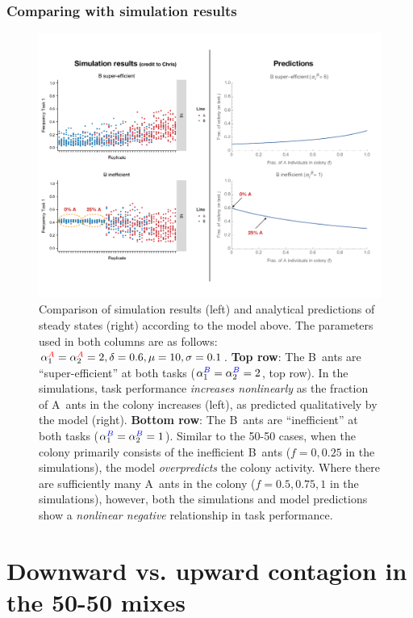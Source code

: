 \documentclass[10pt]{article}
\newcommand{\A}{{\color{red}A}}
\newcommand{\B}{{\color{blue}B}}
\begin{document}
\subsubsection{Comparing with simulation results}
\begin{figure}[H]
    \centering
    \includegraphics[trim={0 1in 0 0.75in}, clip, width=0.95\linewidth]{output/Task_dist/mixes_comparison.pdf}
    \caption{Comparison of simulation results (left) and analytical predictions of steady states (right) according to the model above. The parameters used in both columns are as follows: $\alpha_1^{\A} = \alpha_2^{\A} = 2, \delta= 0.6, \mu=10, \sigma = 0.1$. 
    \textbf{Top row}: The \B\ ants are ``super-efficient'' at both tasks ($\alpha_1^{\B} = \alpha_2^{\B} = 2$, top row). In the simulations, task performance \textit{increases nonlinearly} as the fraction of \A\ ants in the colony increases (left), as predicted qualitatively by the model (right).
    \textbf{Bottom row}: The \B\ ants are ``inefficient'' at both tasks ($\alpha_1^{\B} = \alpha_2^{\B} = 1$). 
    Similar to the 50-50 cases, when the colony primarily consists of the inefficient \B\ ants ($f = 0, 0.25$ in the simulations), the model \textit{overpredicts} the colony activity.
    Where there are sufficiently many \A\ ants in the colony ($f = 0.5, 0.75, 1$ in the simulations), however, both the simulations and model predictions show a \textit{nonlinear negative} relationship in task performance.}
    \label{fig:mixes_comp}
\end{figure}

\section{Downward vs. upward contagion in the 50-50 mixes} \label{sec:contagion}
\end{document}
